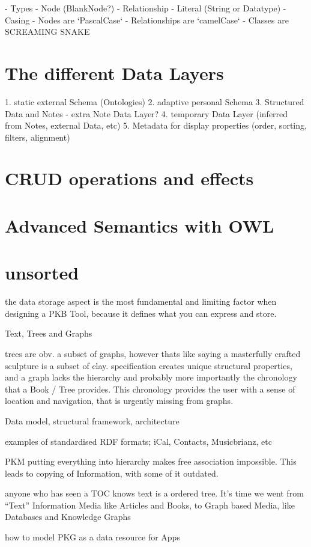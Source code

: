 - Types
    - Node (BlankNode?)
    - Relationship
    - Literal (String or Datatype)
- Casing
    - Nodes are `PascalCase`
    - Relationships are `camelCase`
    - Classes are SCREAMING SNAKE

\section{The different Data Layers}

1. static external Schema (Ontologies)
2. adaptive personal Schema
3. Structured Data and Notes
    - extra Note Data Layer?
4. temporary Data Layer (inferred from Notes, external Data, etc)
5. Metadata for display properties (order, sorting, filters, alignment)
\section{CRUD operations and effects}
\section{Advanced Semantics with OWL}
\section{unsorted}
the data storage aspect is the most fundamental and limiting factor when designing a PKB Tool, because it defines what you can express and store.

Text, Trees and Graphs

trees are obv. a subset of graphs, however thats like saying a masterfully crafted sculpture is a subset of clay. specification creates unique structural properties, and a graph lacks the hierarchy and probably more importantly the chronology that a Book / Tree provides. This chronology provides the user with a sense of location and navigation, that is urgently missing from graphs.

Data model, structural framework, architecture

examples of standardised RDF formats; iCal, Contacts, Musicbrianz, etc

PKM putting everything into hierarchy makes free association impossible. This leads to copying of Information, with some of it outdated.

anyone who has seen a TOC knows text is a ordered tree. It’s time we went from “Text” Information Media like Articles and Books, to Graph based Media, like Databases and Knowledge Graphs

how to model PKG as a data resource for Apps

